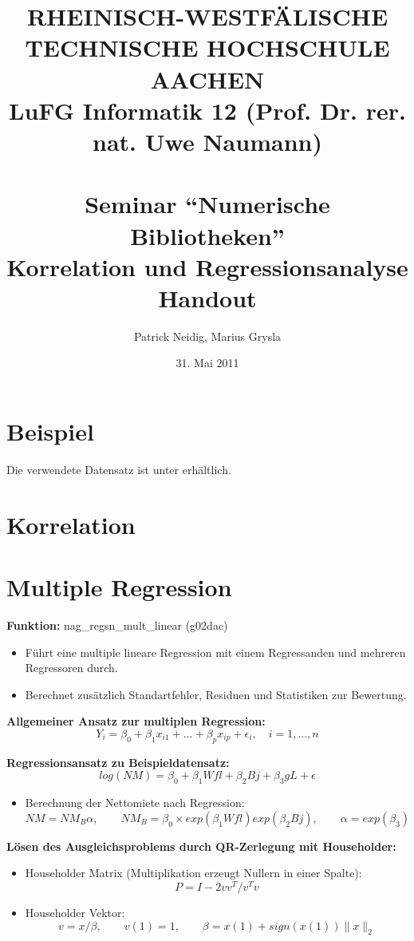 \documentclass[a4paper]{article}
\title{
{\bf \scriptsize RHEINISCH-WESTF\"ALISCHE TECHNISCHE HOCHSCHULE AACHEN \\
LuFG Informatik 12 (Prof. Dr. rer. nat. Uwe Naumann)}\\
~\\
Seminar ``Numerische Bibliotheken''\\
{\bf \Large Korrelation und Regressionsanalyse} \\
{\large Handout} 
}
\author{Patrick Neidig, Marius Grysla}
\date{31. Mai 2011}
\begin{document}
\maketitle

\section*{Beispiel}
Die verwendete Datensatz ist unter \cite{Fahrmeier2011} erhältlich.

\section*{Korrelation}

\section*{Multiple Regression}

{\bf Funktion:} nag\_regsn\_mult\_linear (g02dac)\cite{nag:intro}
\begin{itemize}
\item Führt eine multiple lineare Regression mit einem Regressanden und mehreren Regressoren durch.
\item Berechnet zusätzlich Standartfehler, Residuen und Statistiken zur Bewertung.
\end{itemize}

{\bf Allgemeiner Ansatz zur multiplen Regression:}\cite{Fahrmeier2010}
\begin{equation*}
  Y_i = \beta_0 + \beta_1 x_{i1} + \dots + \beta_p x_{ip} + \epsilon_i, \quad i = 1, \dots, n
\end{equation*}

{\bf Regressionsansatz zu Beispieldatensatz:}
\begin{equation*}
  log(NM) = \beta_0 + \beta_1 Wfl + \beta_2 Bj + \beta_3 gL + \epsilon
\end{equation*}
\begin{itemize}
\item Berechnung der Nettomiete nach Regression:
  \begin{equation*}
    NM = NM_B \alpha,\qquad
    NM_B = \beta_0 \times exp(\beta_1 Wfl) exp(\beta_2 Bj),\qquad
    \alpha = exp(\beta_3)
  \end{equation*}
\end{itemize}


{\bf Lösen des Ausgleichsproblems durch QR-Zerlegung mit Householder:}\cite{Golub1989}
\begin{itemize}
\item Householder Matrix (Multiplikation erzeugt Nullern in einer Spalte):
  \begin{equation*}
    P = I - 2vv^T / v^Tv
  \end{equation*}
\item Householder Vektor:
  \begin{equation*}
    v = x / \beta,\qquad v(1) = 1, \qquad \beta = x(1) + sign(x(1)) \|x\|_2
  \end{equation*}
\end{itemize}



\end{document}
